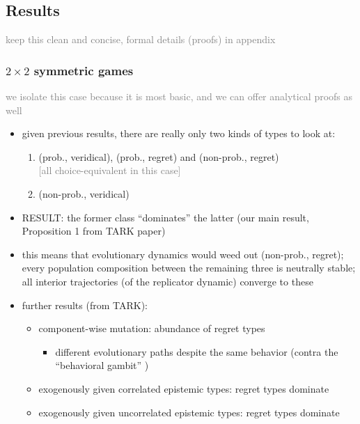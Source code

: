 \documentclass[fleqn,reqno,11pt]{article}
\begin{document}
\subsection{Results}

\textcolor{gray}{keep this clean and concise, formal details (proofs) in appendix}

\subsubsection{$2 \times 2$ symmetric games}

\textcolor{gray}{we isolate this case because it is most basic, and we can offer analytical
  proofs as well}

\begin{itemize}
\item given previous results, there are really only two kinds of types to look at:
  \begin{enumerate}
  \item (prob., veridical), (prob., regret) and (non-prob., regret) \\ 
    \textcolor{gray}{[all choice-equivalent in this case]}
  \item (non-prob., veridical)
  \end{enumerate}
\item RESULT: the former class ``dominates'' the latter (our main result, Proposition 1 from
  TARK paper)
\item this means that evolutionary dynamics would weed out (non-prob., regret); every
  population composition between the remaining three is neutrally stable; all interior
  trajectories (of the replicator dynamic) converge to these
\item further results (from TARK):
  \begin{itemize}
  \item component-wise mutation: abundance of regret types
    \begin{itemize}
    \item different evolutionary paths despite the same behavior (contra the ``behavioral
      gambit'' \citep{FawcettHamblin2013:Exposing-the-be})
    \end{itemize}
  \item exogenously given correlated epistemic types: regret types dominate
  \item exogenously given uncorrelated epistemic types: regret types dominate
  \end{itemize}
\end{itemize}
\end{document}
